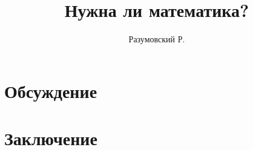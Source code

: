 \documentclass[12pt,a4paper]{article}
\title{Нужна ли математика?}
\date{} %
\author{Разумовский Р.}
\numberwithin{equation}{section}
\begin{document}
    \maketitle

    \begin{abstract}
        
    \end{abstract}


    \section{Обсуждение} \label{sec:introduction}
    


    \section{Заключение}\label{sec:conclusions}
    
\end{document}
